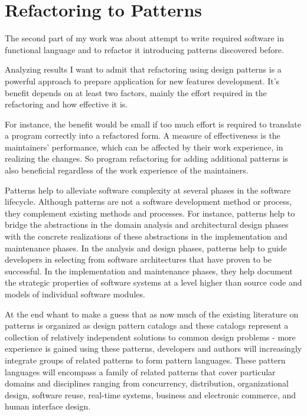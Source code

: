 

\section{Refactoring to Patterns}

The second part of my work was about attempt to write required software in functional language and to refactor it introducing patterns discovered before.

Analyzing results I want to admit that refactoring using design patterns is a powerful approach to prepare application for new features development. It's benefit depends on at least two factors, mainly the effort required in the refactoring and how effective it is. 

For instance, the benefit would be small if too much effort is required to translate a program correctly into a refactored form. A measure of effectiveness is the maintainers' performance, which can be affected by their work experience, in realizing the changes. So program refactoring for adding additional patterns is also beneficial regardless of the work experience of the maintainers.

Patterns help to alleviate software complexity at several phases in the software lifecycle. Although patterns are not a software development method or process, they complement existing methods and processes. For instance, patterns help to bridge the abstractions in the domain analysis and architectural design phases with the concrete realizations of these abstractions in the implementation and maintenance phases. In the analysis and design phases, patterns help to guide developers in selecting from software architectures that have proven to be successful. In the implementation and maintenance phases, they help document the strategic properties of software systems at a level higher than source code and models of individual software modules.

At the end whant to make a guess that as now much of the existing literature on patterns is organized as design pattern catalogs and these catalogs represent a collection of relatively independent solutions to common design problems - more experience is gained using these patterns, developers and authors will increasingly integrate groups of related patterns to form pattern languages. These pattern languages will encompass a family of related patterns that cover particular domains and disciplines ranging from concurrency, distribution, organizational design, software reuse, real-time systems, business and electronic commerce, and human interface design.
